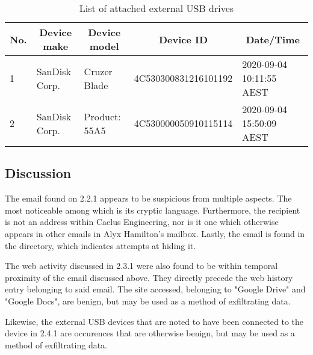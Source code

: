 \begin{table}
    \caption{List of attached external USB drives}\label{tab:usb-drives}
    \begin{center}
        \begin{tabular}[c]{|l|l|l|l|l|}
            \hline

            \multicolumn{1}{|c}{\textbf{No.}} & 
            \multicolumn{1}{|c}{\textbf{Device make}} & 
            \multicolumn{1}{|c}{\textbf{Device model}} & 
            \multicolumn{1}{|c}{\textbf{Device ID}} & 
            \multicolumn{1}{|c|}{\textbf{Date/Time}} \\

            \hline

            1 & SanDisk Corp. & Cruzer Blade & 4C530300831216101192 & 2020-09-04 10:11:55 AEST \\
            2 & SanDisk Corp. & Product: 55A5 & 4C530000050910115114 & 2020-09-04 15:50:09 AEST \\

            \hline
        \end{tabular}
    \end{center}
\end{table}


\subsection{Discussion} %
\label{sub:discussion}

The email found on 2.2.1 appears to be suspicious from multiple aspects. The most noticeable among which is its cryptic language. Furthermore, the recipient is not an address within Caelus Engineering, nor is it one which otherwise appears in other emails in Alyx Hamilton's mailbox. Lastly, the email is found in the  directory, which indicates attempts at hiding it.

The web activity discussed in 2.3.1 were also found to be within temporal proximity of the email discussed above. They directly precede the web history entry belonging to said email. The site accessed, belonging to "Google Drive" and "Google Docs", are benign, but may be used as a method of exfiltrating data.

Likewise, the external USB devices that are noted to have been connected to the device in 2.4.1 are occurences that are otherwise benign, but may be used as a method of exfiltrating data.


